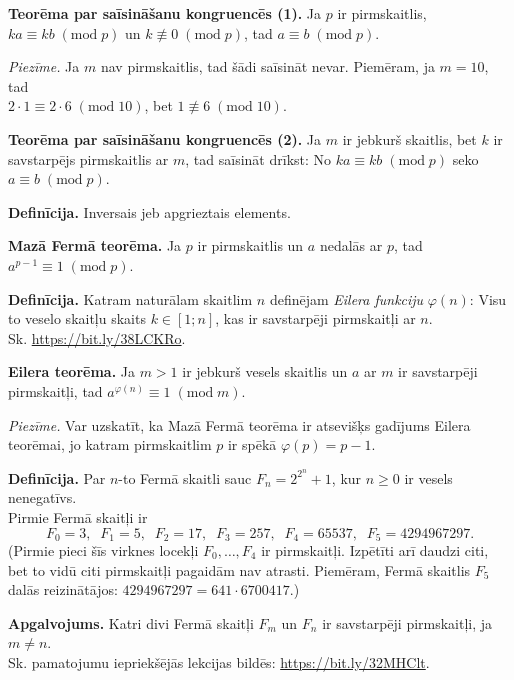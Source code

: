 \documentclass[a4paper,12pt]{article}
\begin{document}
\vspace{10pt}
{\bf Teorēma par saīsināšanu kongruencēs (1).} Ja $p$ ir pirmskaitlis, $ka \equiv kb\;(\text{mod}\;p)$ un $k \not\equiv 0\;(\text{mod}\;p)$, 
tad $a \equiv b\;(\text{mod}\;p)$.

\vspace{5pt}
{\em Piezīme.} Ja $m$ nav pirmskaitlis, tad šādi saīsināt nevar. Piemēram, ja $m=10$, tad\\ 
$2 \cdot 1 \equiv 2 \cdot 6\;(\text{mod}\;10)$, bet $1 \not\equiv 6\;(\text{mod}\;10)$.

\vspace{10pt}
{\bf Teorēma par saīsināšanu kongruencēs (2).} Ja $m$ ir jebkurš skaitlis, bet $k$ ir savstarpējs pirmskaitlis ar $m$, tad 
saīsināt drīkst: No $ka \equiv kb\;(\text{mod}\;p)$ seko $a \equiv b\;(\text{mod}\;p)$.

\vspace{10pt}
{\bf Definīcija.} Inversais jeb apgrieztais elements.






\vspace{10pt}
{\bf Mazā Fermā teorēma.} Ja $p$ ir pirmskaitlis un $a$ nedalās ar $p$, tad $a^{p-1} \equiv 1\;(\text{mod}\;p)$. 

\vspace{10pt}
{\bf Definīcija.} Katram naturālam skaitlim $n$ definējam {\em Eilera funkciju} $\varphi(n)$: Visu to 
veselo skaitļu skaits $k \in [1;n]$, kas ir savstarpēji pirmskaitļi ar $n$.\\
Sk. \url{https://bit.ly/38LCKRo}.

\vspace{10pt}
{\bf Eilera teorēma.} Ja $m>1$ ir jebkurš vesels skaitlis un $a$ ar $m$ ir savstarpēji pirmskaitļi, tad 
$a^{\varphi(n)} \equiv 1\;(\text{mod}\;m)$. 

\vspace{5pt}
{\em Piezīme.} Var uzskatīt, ka Mazā Fermā teorēma ir atsevišķs gadījums Eilera teorēmai, jo katram pirmskaitlim $p$
ir spēkā $\varphi(p) = p-1$.  

\vspace{10pt}
{\bf Definīcija.} Par $n$-to Fermā skaitli sauc $F_{n} = 2^{2^n} + 1$, kur $n\geq 0$ ir vesels nenegatīvs.\\
Pirmie Fermā skaitļi ir 
$$F_0=3,\;\; F_1=5,\;\; F_2=17,\;\; F_3=257,\;\; F_4=65537,\;\; F_5=4294967297.$$ 
(Pirmie pieci šīs virknes locekļi $F_0,\ldots,F_4$ ir pirmskaitļi. 
Izpētīti arī daudzi citi, bet to vidū citi pirmskaitļi pagaidām nav atrasti. 
Piemēram, Fermā skaitlis $F_5$ dalās reizinātājos: $4294967297 = 641 \cdot 6700417$.)


\vspace{10pt}
{\bf Apgalvojums.} Katri divi Fermā skaitļi $F_m$ un $F_n$ ir savstarpēji pirmskaitļi, ja $m \neq n$.\\
Sk. pamatojumu iepriekšējās lekcijas bildēs: \url{https://bit.ly/32MHClt}.
\end{document}
